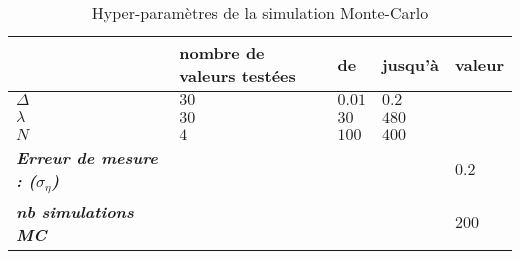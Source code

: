 \begin{table}[H]
	\centering
	\begin{tabular}{l|l|ll|l|}
		\cline{2-5}
		\textbf{}                                                                  & \textbf{nombre de valeurs testées} & \multicolumn{1}{l|}{\textbf{de}} & \textbf{jusqu'à}         & \textbf{valeur}          \\ \hline
		\multicolumn{1}{|l|}{\textit{\textbf{$\Delta$}}}                           & $30$                               & $0.01$                           & $0.2$                    & \cellcolor[HTML]{C0C0C0} \\
		\multicolumn{1}{|l|}{\textit{\textbf{$\lambda$}}}                          & $30$                               & $30$                             & $480$                    & \cellcolor[HTML]{C0C0C0} \\
		\multicolumn{1}{|l|}{\textit{\textbf{$N$}}}                                & $4$                                & $100$                            & $400$                    & \cellcolor[HTML]{C0C0C0} \\
		\multicolumn{1}{|l|}{\textit{\textbf{Erreur de mesure : ($\sigma_\eta$)}}} & \cellcolor[HTML]{C0C0C0}           & \cellcolor[HTML]{C0C0C0}         & \cellcolor[HTML]{C0C0C0} & $0.2$                    \\
		\multicolumn{1}{|l|}{\textit{\textbf{nb simulations MC}}}                  & \cellcolor[HTML]{C0C0C0}           & \cellcolor[HTML]{C0C0C0}         & \cellcolor[HTML]{C0C0C0} & $200$                    \\ \hline
	\end{tabular}
	\caption{Hyper-paramètres de la simulation Monte-Carlo}
	\label{tab:hyperparam-mc}
\end{table}
